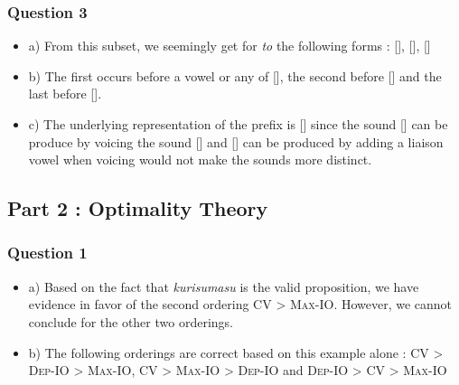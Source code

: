 \documentclass{cours}
\begin{document}
\subsubsection{Question 3}
\begin{itemize}
    \item a) From this subset, we seemingly get for \textsl{to} the following forms : [], [], []
    \item b) The first occurs before a vowel or any of [], the second before [] and the last before []. 
    \item c) The underlying representation of the prefix is [] since the sound [] can be produce by voicing the sound [] and [] can be produced by adding a liaison vowel when voicing would not make the sounds more distinct. 
\end{itemize}

\subsection{Part 2 : Optimality Theory}
\subsubsection{Question 1}
\begin{itemize}
    \item a) Based on the fact that \textsl{kurisumasu} is the valid proposition, we have evidence in favor of the second ordering \textsc{CV > Max-IO}. However, we cannot conclude for the other two orderings.
    \item b) The following orderings are correct based on this example alone : \textsc{CV > Dep-IO > Max-IO}, \textsc{CV > Max-IO > Dep-IO} and \textsc{Dep-IO > CV > Max-IO}
\end{itemize}
\end{document}
